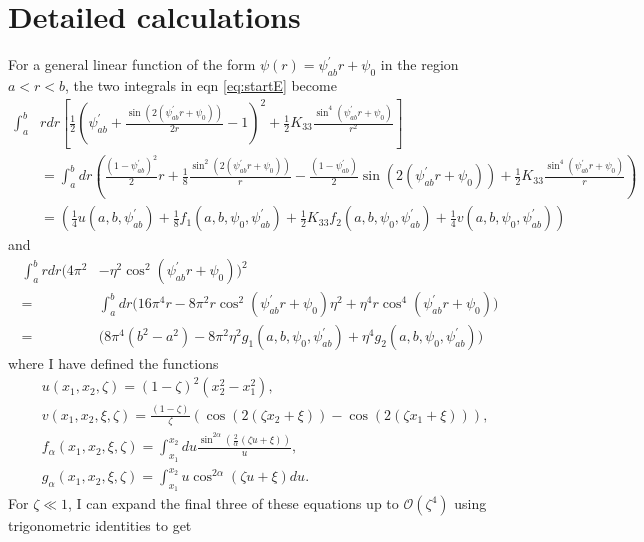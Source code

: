 \documentclass[12pt]{article}
\begin{document}
\section{Detailed calculations}
For a general linear function of the form $\psi(r)=\psi_{ab}^{\prime}r+\psi_0$ in the region $a<r<b$, the two integrals in eqn \ref{eq:startE} become
\begin{align}\label{eq:first_int}
\int_{a}^{b}&rdr\left[\frac{1}{2}\left(\psi_{ab}^{\prime}+\frac{\sin(2(\psi_{ab}^{\prime}r+\psi_0))}{2r}-1\right)^2+\frac{1}{2}K_{33}\frac{\sin^4(\psi_{ab}^{\prime}r+\psi_0)}{r^2}\right]\nonumber\\
&=\int_{a}^{b}dr\left(\frac{(1-\psi_{ab}^{\prime})^2}{2}r+\frac{1}{8}\frac{\sin^2(2(\psi_{ab}^{\prime}r+\psi_0))}{r}-\frac{(1-\psi_{ab}^{\prime})}{2}\sin(2(\psi_{ab}^{\prime}r+\psi_0))+\frac{1}{2}K_{33}\frac{\sin^4(\psi_{ab}^{\prime}r+\psi_0)}{r}\right)\nonumber\\
&=\left(\frac{1}{4}u(a,b,\psi_{ab}^{\prime})+\frac{1}{8}f_1(a,b,\psi_0,\psi_{ab}^{\prime})+\frac{1}{2}K_{33}f_2(a,b,\psi_0,\psi_{ab}^{\prime})+\frac{1}{4}v(a,b,\psi_0,\psi_{ab}^{\prime})\right)
\end{align}
and
\begin{align}\label{eq:second_int}
\int_{a}^{b}rdr\big(4\pi^2&-\eta^2\cos^2(\psi_{ab}^{\prime}r+\psi_0)\big)^2\nonumber\\
=&\int_{a}^{b}dr\big(16\pi^4r-8\pi^2r\cos^2(\psi_{ab}^{\prime}r+\psi_0)\eta^2+\eta^4r\cos^4(\psi_{ab}^{\prime}r+\psi_0)\big)\nonumber\\
=&\big(8\pi^4(b^2-a^2)-8\pi^2\eta^2g_1(a,b,\psi_0,\psi_{ab}^{\prime})+\eta^4g_2(a,b,\psi_0,\psi_{ab}^{\prime})\big)
\end{align}
where I have defined the functions
\begin{subequations}
\begin{align}
&u(x_1,x_2,\zeta)=(1-\zeta)^2(x_2^2-x_1^2),\label{eq:ufunc}\\
&v(x_1,x_2,\xi,\zeta)=\frac{(1-\zeta)}{\zeta}(\cos(2(\zeta x_2+\xi))-\cos(2(\zeta x_1+\xi))),\label{eq:vfunc}\\
&f_{\alpha}(x_1,x_2,\xi,\zeta)=\int_{x_1}^{x_2}du\frac{\sin^{2\alpha}\left(\frac{2}{\alpha}(\zeta u+\xi)\right)}{u},\label{eq:falpha}\\
&g_{\alpha}(x_1,x_2,\xi,\zeta)=\int_{x_1}^{x_2}u\cos^{2\alpha}(\zeta u+\xi)du.\label{eq:galpha}
\end{align}
\end{subequations}
For $\zeta\ll1$, I can expand the final three of these equations up to $\mathcal{O}(\zeta^4)$ using trigonometric identities to get
\end{document}
